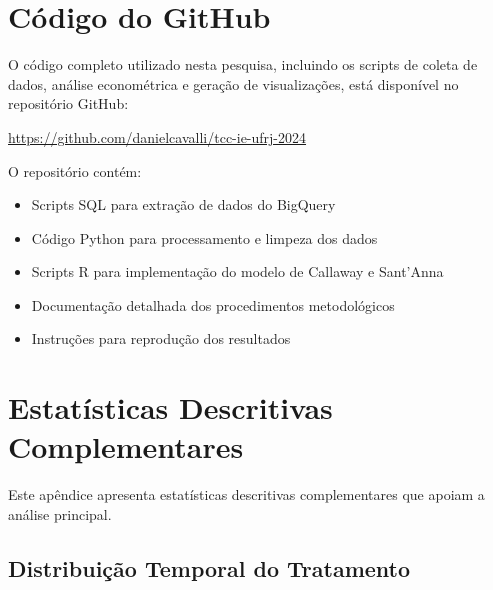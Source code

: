 \documentclass[
	12pt,				%
	oneside,			%
	a4paper,			%
	english,			%
	french,				%
	spanish,			%
	brazil				%
	]{abntex2}
\begin{document}




\begin{apendicesenv}

\partapendices

\chapter{Código do GitHub}

O código completo utilizado nesta pesquisa, incluindo os scripts de coleta de dados, análise econométrica e geração de visualizações, está disponível no repositório GitHub:

\url{https://github.com/danielcavalli/tcc-ie-ufrj-2024}

O repositório contém:
\begin{itemize}
\item Scripts SQL para extração de dados do BigQuery
\item Código Python para processamento e limpeza dos dados
\item Scripts R para implementação do modelo de Callaway e Sant'Anna
\item Documentação detalhada dos procedimentos metodológicos
\item Instruções para reprodução dos resultados
\end{itemize}

\chapter{Estatísticas Descritivas Complementares}

Este apêndice apresenta estatísticas descritivas complementares que apoiam a análise principal.

\section{Distribuição Temporal do Tratamento}


\end{apendicesenv}
\end{document}
